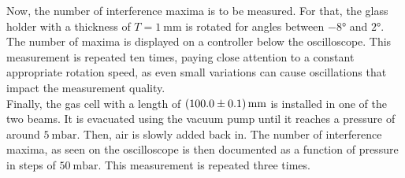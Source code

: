 Now, the number of interference maxima is to be measured.
For that, the glass holder with a thickness of $T = \SI{1}{\milli\meter}$ is rotated for angles between $-8°$ and $2°$.
The number of maxima is displayed on a controller below the oscilloscope.
This measurement is repeated ten times, paying close attention to a constant appropriate rotation speed, as even small variations can cause oscillations that impact the measurement quality. \\

Finally, the gas cell with a length of $\SI{100.0 \pm 0.1}{\milli\meter}$ is installed in one of the two beams.
It is evacuated using the vacuum pump until it reaches a pressure of around $\SI{5}{\milli\bar}$.
Then, air is slowly added back in.
The number of interference maxima, as seen on the oscilloscope is then documented as a function of pressure in steps of $\SI{50}{\milli\bar}$.
This measurement is repeated three times.

